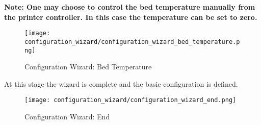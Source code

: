 \textbf{Note: One may choose to control the bed temperature manually from the printer controller. In this case the temperature can be set to zero.}

\begin{figure}[H]
\centering
\texttt{[image: configuration\_wizard/configuration\_wizard\_bed\_temperature.png]}
\caption{Configuration Wizard: Bed Temperature}
\label{fig:configuration_wizard_bed_temperature}
\end{figure}

\newpage

At this stage the wizard is complete and the basic configuration is defined.

\begin{figure}[H]
\centering
\texttt{[image: configuration\_wizard/configuration\_wizard\_end.png]}
\caption{Configuration Wizard: End}
\label{fig:configuration_wizard_end}
\end{figure}

